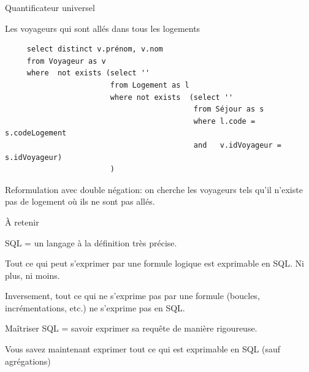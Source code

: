 \begin{frame}[fragile]{Quantificateur universel}

Les voyageurs qui sont allés dans \alert{tous} les logements

\vfill 
\begin{verbatim}
     select distinct v.prénom, v.nom
     from Voyageur as v
     where  not exists (select ''
                        from Logement as l
                        where not exists  (select ''
                                           from Séjour as s
                                           where l.code = s.codeLogement
                                           and   v.idVoyageur = s.idVoyageur)
                        )
\end{verbatim}
\vfill
\begin{blocgauche}
Reformulation avec double négation: on cherche les voyageurs tels \alert{qu’il n’existe pas} 
de logement où \alert{ils ne sont pas} allés.
\end{blocgauche}
\end{frame}
\begin{frame}{À retenir}

SQL = un langage à la définition très précise.
\vfill

\begin{redbullet}
  \item  \alert{Tout ce qui peut s'exprimer par une formule logique est exprimable en SQL}. Ni plus, ni moins.

  \item \alert{Inversement}, tout ce qui ne s'exprime pas par une formule (boucles, incrémentations, etc.)
      ne s'exprime pas en SQL.
\end{redbullet}

\vfill
\begin{blocgauche}
Maîtriser SQL = savoir exprimer sa requête de manière rigoureuse. 
\end{blocgauche}

\vspace*{1cm}

Vous savez maintenant exprimer \alert{tout} ce qui est exprimable
en SQL (sauf agrégations)
\end{frame}



